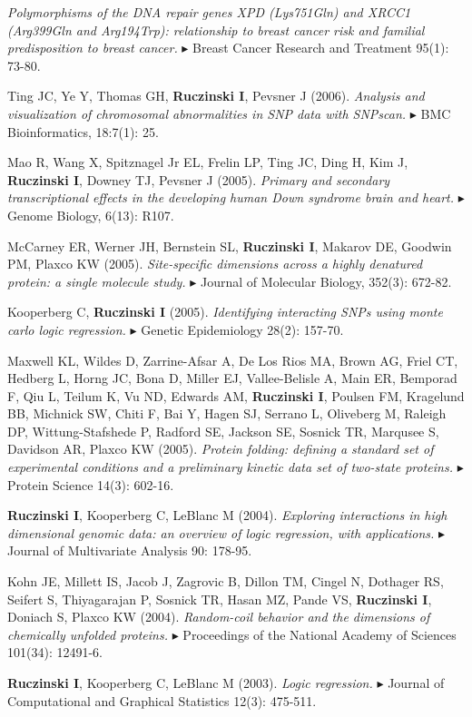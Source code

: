 \documentclass[10pt]{article}
\newcommand{\mine}{
  \addtocounter{enumi}{1}
\item[\fcolorbox{white}{grey}{\color{white} \tiny \arabic{enumi}}]
}
\newcommand{\dg}[1]{{\color{black} $\blacktriangleright$ {#1}}}
\begin{document}
{\it Polymorphisms of the DNA repair genes XPD (Lys751Gln) and XRCC1 (Arg399Gln and Arg194Trp): relationship to breast cancer risk and familial predisposition to breast cancer.}
\dg{Breast Cancer Research and Treatment} 95(1): 73-80.
\item
Ting JC, Ye Y, Thomas GH, {\bf Ruczinski I}, Pevsner J (2006).
{\it Analysis and visualization of chromosomal abnormalities in SNP data with SNPscan.}
\dg{BMC Bioinformatics}, 18:7(1): 25.
\item
Mao R, Wang X, Spitznagel Jr EL, Frelin LP, Ting JC, Ding H, Kim J, {\bf Ruczinski I}, Downey TJ, Pevsner J (2005). 
{\it Primary and secondary transcriptional effects in the developing human Down syndrome brain and heart.}
\dg{Genome Biology}, 6(13): R107.
\item
McCarney ER, Werner JH, Bernstein SL, {\bf Ruczinski I}, Makarov DE, Goodwin PM, Plaxco KW (2005). 
{\it Site-specific dimensions across a highly denatured protein: a single molecule study.} 
\dg{Journal of Molecular Biology}, 352(3): 672-82.
\mine
Kooperberg C, {\bf Ruczinski I} (2005). 
{\it Identifying interacting SNPs using monte carlo logic regression.}
\dg{Genetic Epidemiology} 28(2): 157-70.  
\item 
Maxwell KL, Wildes D, Zarrine-Afsar A, De Los Rios MA, Brown AG, Friel CT, Hedberg L, Horng JC, Bona D, Miller EJ, Vallee-Belisle A, Main ER, Bemporad F, Qiu L, Teilum K, Vu ND, Edwards AM, {\bf Ruczinski I}, Poulsen FM, Kragelund BB, Michnick SW, Chiti F, Bai Y, Hagen SJ, Serrano L, Oliveberg M, Raleigh DP, Wittung-Stafshede P, Radford SE, Jackson SE, Sosnick TR, Marqusee S, Davidson AR, Plaxco KW (2005). 
{\it Protein folding: defining a standard set of experimental conditions and a preliminary kinetic data set of two-state proteins.}
\dg{Protein Science} 14(3): 602-16.
\mine
{\bf Ruczinski I}, Kooperberg C, LeBlanc M (2004).  
{\it Exploring interactions in high dimensional genomic data: an overview of logic regression, with applications.}
\dg{Journal of Multivariate Analysis} 90: 178-95. 
\item 
Kohn JE, Millett IS, Jacob J, Zagrovic B, Dillon TM, Cingel N, Dothager RS, Seifert S, Thiyagarajan P, Sosnick TR, Hasan MZ, Pande VS, {\bf Ruczinski I}, Doniach S, Plaxco KW (2004). 
{\it Random-coil behavior and the dimensions of chemically unfolded proteins.}
\dg{Proceedings of the National Academy of Sciences} 101(34): 12491-6.
\mine
{\bf Ruczinski I}, Kooperberg C, LeBlanc M (2003). 
{\it Logic regression.}
\dg{Journal of Computational and Graphical Statistics} 12(3): 475-511. 
\end{document}
